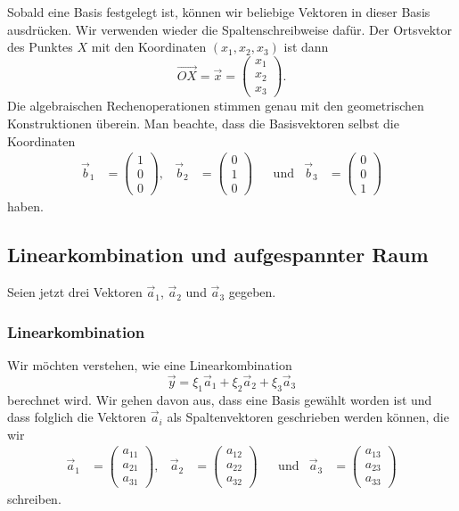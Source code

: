 Sobald eine Basis festgelegt ist, können wir beliebige Vektoren in dieser
Basis ausdrücken. 
Wir verwenden wieder die Spaltenschreibweise dafür.
Der Ortsvektor des Punktes $X$ mit den Koordinaten $(x_1,x_2,x_3)$ ist dann
\[
\overrightarrow{OX}
=
\vec{x}
= 
\begin{pmatrix}x_1\\x_2\\x_3\end{pmatrix}.
\]
Die algebraischen Rechenoperationen stimmen genau mit den geometrischen
Konstruktionen überein.
Man beachte, dass die Basisvektoren selbst die Koordinaten
\[
\begin{aligned}
\vec{b}_1 &= \begin{pmatrix}1\\0\\0\end{pmatrix}, &
\vec{b}_2 &= \begin{pmatrix}0\\1\\0\end{pmatrix} &
          &\text{und}&
\vec{b}_3 &= \begin{pmatrix}0\\0\\1\end{pmatrix}
\end{aligned}
\]
haben.

%
%
\subsection{Linearkombination und aufgespannter Raum}
Seien jetzt drei Vektoren $\vec{a}_1$, $\vec{a}_2$ und $\vec{a}_3$ gegeben.

\subsubsection{Linearkombination}
Wir möchten verstehen, wie eine Linearkombination
\[
\vec{y}
=
\xi_1\vec{a}_1
+
\xi_2\vec{a}_2
+
\xi_3\vec{a}_3
\]
berechnet wird.
Wir gehen davon aus, dass eine Basis gewählt worden ist und dass
folglich die Vektoren $\vec{a}_i$ als Spaltenvektoren geschrieben
werden können, die wir
\[
\begin{aligned}
\vec{a}_1 &= \begin{pmatrix}a_{11}\\a_{21}\\a_{31}\end{pmatrix}, &
\vec{a}_2 &= \begin{pmatrix}a_{12}\\a_{22}\\a_{32}\end{pmatrix}
&&\text{und}&
\vec{a}_3 &= \begin{pmatrix}a_{13}\\a_{23}\\a_{33}\end{pmatrix}
\end{aligned}
\]
schreiben.

